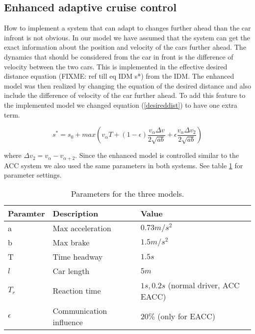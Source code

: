 \subsection {Enhanced adaptive cruise control}
How to implement a system that can adapt to changes further ahead than the car infront is not obvious. In our model we have assumed that the system can get the exact information about the position and velocity of the cars further ahead.
The dynamics that should be considered from the car in front is the difference of velocity between the two cars. This is implemented in the effective desired distance equation (FIXME: ref till eq IDM s*) from the IDM. The enhanced model was then realized by changing the equation of the desired distance and also include the difference of velocity of the car further ahead. To add this feature to the implemented model we changed equation (\ref{desireddist}) to have one extra term.

\begin{equation}s^\ast = s_0 + max(v_\alpha T + (1-\epsilon )\frac{v_\alpha \Delta v}{2\sqrt{ab}} + \epsilon \frac{v_\alpha \Delta v_2}{2\sqrt{ab}})\end{equation}

where $ \Delta v_2 = v_\alpha - v_{\alpha +2} $.
Since the enhanced model is controlled similar to the ACC system we also used the same parameters in both systems. See table \ref{config} for parameter settings.

\begin{center}
\begin{table}[H]
\begin{tabular}{| l | l | l |} \hline
Paramter & Description & Value\\ \hline
a & Max acceleration & $ 0.73 \unit{m/s^2} $\\ \hline
b & Max brake & $ 1.5 \unit{m/s^2} $\\ \hline
T & Time headway & $ 1.5 \unit{s} $ \\ \hline
$ l $ & Car length & $ 5 \unit{m} $ \\ \hline
$ T_r $ & Reaction time & $ 1 \unit{s}, 0.2 \unit{s} $ (normal driver, ACC EACC) \\ \hline
$ \epsilon $ & Communication influence & $ 20 \% $ (only for EACC) \\ \hline
\end{tabular}
\caption{\label{config} Parameters for the three models.}
\end{table}
\end{center}


